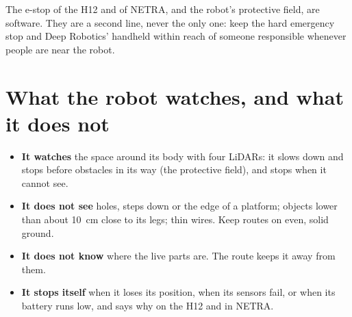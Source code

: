 \begin{dangerbox}
The e-stop of the H12 and of NETRA, and the robot's protective field, are software. They are a
second line, never the only one: keep the hard emergency stop and Deep Robotics' handheld within
reach of someone responsible whenever people are near the robot.
\end{dangerbox}

\section{What the robot watches, and what it does not}

\begin{itemize}
  \item \textbf{It watches} the space around its body with four LiDARs: it slows down and stops
    before obstacles in its way (the protective field), and stops when it cannot see.
  \item \textbf{It does not see} holes, steps down or the edge of a platform; objects lower than
    about 10~cm close to its legs; thin wires. Keep routes on even, solid ground.
  \item \textbf{It does not know} where the live parts are. The route keeps it away from them.
  \item \textbf{It stops itself} when it loses its position, when its sensors fail, or when its
    battery runs low, and says why on the H12 and in NETRA.
\end{itemize}
